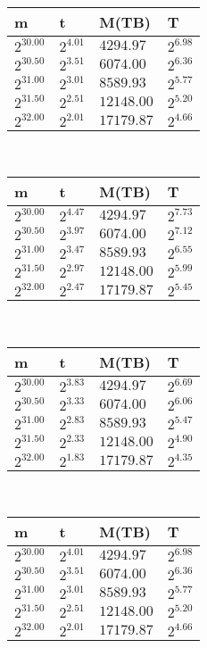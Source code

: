  \ 
\begin{tabular}{llll}
m & t & M(TB) & T \\ \hline
$2^{30.00}$ & $2^{4.01}$ & $4294.97$ & $2^{6.98}$ \\
$2^{30.50}$ & $2^{3.51}$ & $6074.00$ & $2^{6.36}$ \\
$2^{31.00}$ & $2^{3.01}$ & $8589.93$ & $2^{5.77}$ \\
$2^{31.50}$ & $2^{2.51}$ & $12148.00$ & $2^{5.20}$ \\
$2^{32.00}$ & $2^{2.01}$ & $17179.87$ & $2^{4.66}$ \\
\end{tabular}
 \ 
\begin{tabular}{llll}
m & t & M(TB) & T \\ \hline
$2^{30.00}$ & $2^{4.47}$ & $4294.97$ & $2^{7.73}$ \\
$2^{30.50}$ & $2^{3.97}$ & $6074.00$ & $2^{7.12}$ \\
$2^{31.00}$ & $2^{3.47}$ & $8589.93$ & $2^{6.55}$ \\
$2^{31.50}$ & $2^{2.97}$ & $12148.00$ & $2^{5.99}$ \\
$2^{32.00}$ & $2^{2.47}$ & $17179.87$ & $2^{5.45}$ \\
\end{tabular}
 \ 
\begin{tabular}{llll}
m & t & M(TB) & T \\ \hline
$2^{30.00}$ & $2^{3.83}$ & $4294.97$ & $2^{6.69}$ \\
$2^{30.50}$ & $2^{3.33}$ & $6074.00$ & $2^{6.06}$ \\
$2^{31.00}$ & $2^{2.83}$ & $8589.93$ & $2^{5.47}$ \\
$2^{31.50}$ & $2^{2.33}$ & $12148.00$ & $2^{4.90}$ \\
$2^{32.00}$ & $2^{1.83}$ & $17179.87$ & $2^{4.35}$ \\
\end{tabular}
 \ 
\begin{tabular}{llll}
m & t & M(TB) & T \\ \hline
$2^{30.00}$ & $2^{4.01}$ & $4294.97$ & $2^{6.98}$ \\
$2^{30.50}$ & $2^{3.51}$ & $6074.00$ & $2^{6.36}$ \\
$2^{31.00}$ & $2^{3.01}$ & $8589.93$ & $2^{5.77}$ \\
$2^{31.50}$ & $2^{2.51}$ & $12148.00$ & $2^{5.20}$ \\
$2^{32.00}$ & $2^{2.01}$ & $17179.87$ & $2^{4.66}$ \\
\end{tabular}
